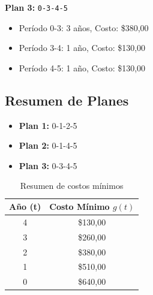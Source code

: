 \documentclass[12pt]{article}
\begin{document}
\textbf{Plan 3:} \texttt{0-3-4-5}
\begin{itemize}\small
\item Período 0-3: 3 años, Costo: \$380,00
\item Período 3-4: 1 año, Costo: \$130,00
\item Período 4-5: 1 año, Costo: \$130,00
\end{itemize}

\subsection*{Resumen de Planes}
\begin{itemize}
\item \textbf{Plan 1:} 0-1-2-5
\item \textbf{Plan 2:} 0-1-4-5
\item \textbf{Plan 3:} 0-3-4-5
\end{itemize}
\begin{table}[H]
\centering
\caption{Resumen de costos mínimos}
\begin{tabular}{cc}
\toprule
Año (t) & Costo Mínimo $g(t)$ \\
\midrule
4 & \$130,00 \\
3 & \$260,00 \\
2 & \$380,00 \\
1 & \$510,00 \\
0 & \$640,00 \\
\bottomrule
\end{tabular}
\end{table}
\end{document}
